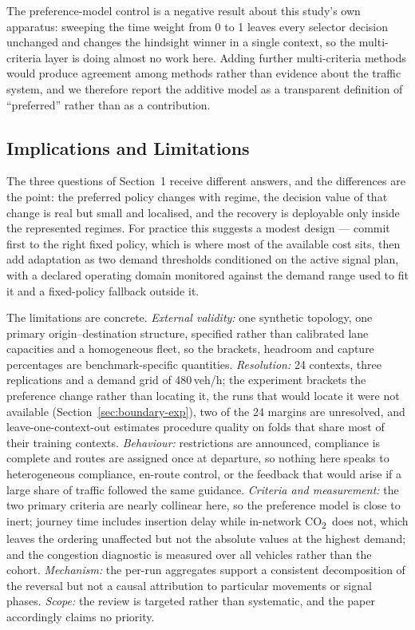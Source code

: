 \documentclass[runningheads]{llncs}
\newcommand{\CO}{CO\textsubscript{2}}
\begin{document}
The preference-model control is a negative result about this study's own apparatus:
sweeping the time weight from 0 to 1 leaves every selector decision unchanged and changes
the hindsight winner in a single context, so the multi-criteria layer is doing almost no
work here. Adding further multi-criteria methods would produce agreement among methods
rather than evidence about the traffic system, and we therefore report the additive model
as a transparent definition of ``preferred'' rather than as a contribution.

\subsection{Implications and Limitations}

The three questions of Section~1 receive different answers, and the differences are the
point: the preferred policy changes with regime, the decision value of that change is real
but small and localised, and the recovery is deployable only inside the represented
regimes. For practice this suggests a modest design --- commit first to the right fixed
policy, which is where most of the available cost sits, then add adaptation as two demand
thresholds conditioned on the active signal plan, with a declared operating domain
monitored against the demand range used to fit it and a fixed-policy fallback outside it.

The limitations are concrete. \emph{External validity:} one synthetic topology, one primary
origin--destination structure, specified rather than calibrated lane capacities and a
homogeneous fleet, so the brackets, headroom and capture percentages are benchmark-specific
quantities. \emph{Resolution:} 24 contexts, three replications and a demand grid of
480\,veh/h; the experiment brackets the preference change rather than locating it, the runs
that would locate it were not available (Section~\ref{sec:boundary-exp}), two of the 24
margins are unresolved, and leave-one-context-out estimates procedure quality on folds that
share most of their training contexts. \emph{Behaviour:} restrictions are announced,
compliance is complete and routes are assigned once at departure, so nothing here speaks to
heterogeneous compliance, en-route control, or the feedback that would arise if a large
share of traffic followed the same guidance. \emph{Criteria and measurement:} the two
primary criteria are nearly collinear here, so the preference model is close to inert;
journey time includes insertion delay while in-network \CO\ does not, which leaves the
ordering unaffected but not the absolute values at the highest demand; and the congestion
diagnostic is measured over all vehicles rather than the cohort. \emph{Mechanism:} the
per-run aggregates support a consistent decomposition of the reversal but not a causal
attribution to particular movements or signal phases. \emph{Scope:} the review is targeted
rather than systematic, and the paper accordingly claims no priority.
\end{document}
